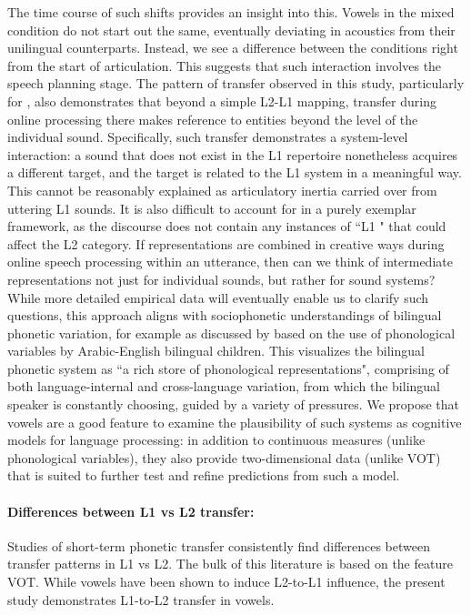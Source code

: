 \documentclass[12 pt]{article}
\newcommand{\nt}[1]{\textipa{[#1]}} %
\begin{document}
The time course of such shifts provides an insight into this. Vowels in the mixed condition do not start out the same, eventually deviating in acoustics from their unilingual counterparts. Instead, we see a difference between the conditions right from the start of articulation. This suggests that such interaction involves the speech planning stage. The pattern of transfer observed in this study, particularly for \nt{2}, also demonstrates that beyond a simple L2-L1 mapping, transfer during online processing there makes reference to entities beyond the level of the individual sound. Specifically, such transfer demonstrates a system-level interaction: a sound that does not exist in the L1 repertoire nonetheless acquires a different target, and the target is related to the L1 system in a meaningful way. This cannot be reasonably explained as articulatory inertia carried over from uttering L1 sounds. It is also difficult to account for in a purely exemplar framework, as the discourse does not contain any instances of ``L1 \nt{2}" that could affect the L2 category. If representations are combined in creative ways during online speech processing within an utterance, then can we think of intermediate representations not just for individual sounds, but rather for sound systems? While more detailed empirical data will eventually enable us to clarify such questions, this approach aligns with sociophonetic understandings of bilingual phonetic variation, for example as discussed by \cite{khattab2009phonetic,khattab2013phonetic} based on the use of phonological variables by Arabic-English bilingual children. This visualizes the bilingual phonetic system as ``a rich store of phonological representations", comprising of both language-internal and cross-language variation, from which the bilingual speaker is constantly choosing, guided by a variety of pressures. We propose that vowels are a good feature to examine the plausibility of such systems as cognitive models for language processing: in addition to continuous measures (unlike phonological variables), they also provide two-dimensional data (unlike VOT) that is suited to further test and refine predictions from such a model.


\paragraph{Differences between L1 vs L2 transfer:}
Studies of short-term phonetic transfer consistently find differences between transfer patterns in L1 vs L2. The bulk of this literature is based on the feature VOT. While vowels have been shown to induce L2-to-L1 influence, the present study demonstrates L1-to-L2 transfer in vowels. 
\end{document}
